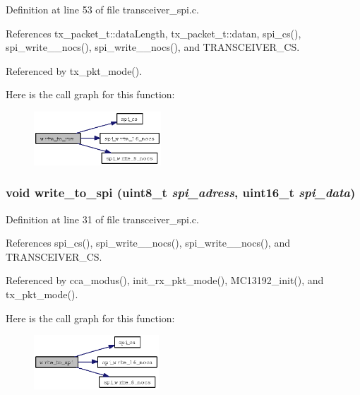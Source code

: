 Definition at line 53 of file transceiver\_\-spi.c.

References tx\_\-packet\_\-t::data\-Length, tx\_\-packet\_\-t::datan, spi\_\-cs(), spi\_\-write\_\_\-nocs(), spi\_\-write\_\_\-nocs(), and TRANSCEIVER\_\-CS.

Referenced by tx\_\-pkt\_\-mode().

Here is the call graph for this function:\begin{figure}[H]
\begin{center}
\leavevmode
\includegraphics[width=135pt]{group__ro__transceiver__spi_g3b940cb98dd035ed3061a30b758adb9c_cgraph}
\end{center}
\end{figure}
\subsubsection{\setlength{\rightskip}{0pt plus 5cm}void write\_\-to\_\-spi (uint8\_\-t {\em spi\_\-adress}, uint16\_\-t {\em spi\_\-data})}\label{group__ro__transceiver__spi_gafa419512a4d33e445196d0d63ae6693}




Definition at line 31 of file transceiver\_\-spi.c.

References spi\_\-cs(), spi\_\-write\_\_\-nocs(), spi\_\-write\_\_\-nocs(), and TRANSCEIVER\_\-CS.

Referenced by cca\_\-modus(), init\_\-rx\_\-pkt\_\-mode(), MC13192\_\-init(), and tx\_\-pkt\_\-mode().

Here is the call graph for this function:\begin{figure}[H]
\begin{center}
\leavevmode
\includegraphics[width=133pt]{group__ro__transceiver__spi_gafa419512a4d33e445196d0d63ae6693_cgraph}
\end{center}
\end{figure}
